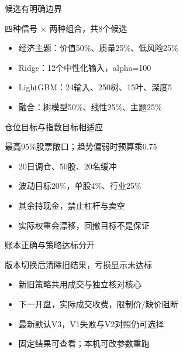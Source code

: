 \documentclass[aspectratio=169,10pt]{beamer}
\begin{document}
\begin{frame}{候选有明确边界}
\begin{block}{}四种信号 $\times$ 两种组合，共8个候选\end{block}
\small\begin{itemize}
\item 经济主题：价值50\%、质量25\%、低风险25\%
\item Ridge：12个中性化输入，alpha=100
\item LightGBM：24输入、250树、15叶、深度5
\item 融合：树模型50\%、线性25\%、主题25\%
\end{itemize}
\end{frame}

\begin{frame}{仓位目标与指数目标相适应}
\begin{block}{}最高95\%股票敞口；趋势偏弱时预算乘0.75\end{block}
\small\begin{itemize}
\item 20日调仓、50股、20名缓冲
\item 波动目标20\%，单股4\%、行业25\%
\item 其余持现金，禁止杠杆与卖空
\item 实际权重会漂移，回撤目标不是保证
\end{itemize}
\end{frame}

\begin{frame}{账本正确与策略达标分开}
\begin{block}{}版本切换后清除旧结果，亏损显示未达标\end{block}
\small\begin{itemize}
\item 新旧策略共用成交与独立核对核心
\item 下一开盘，实际成交收费，限制价/缺价阻断
\item 最新默认V3，V1失败与V2对照仍可选择
\item 固定结果可查看；本机可改参数重跑
\end{itemize}
\end{frame}
\end{document}
